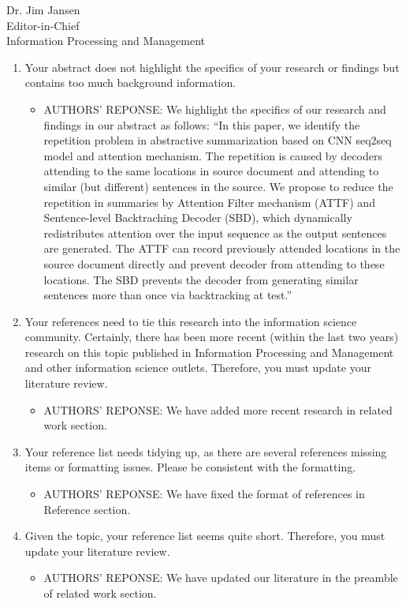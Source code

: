 \documentclass[11pt]{letter} %
\begin{document}
\begin{letter}{Dr. Jim Jansen \\
			Editor-in-Chief  \\
			Information Processing and Management}
		\flushleft
		\begin{enumerate}
			\item Your abstract does not highlight the specifics of your research or findings but contains too much background information.
			\begin{itemize}
				\item[] AUTHORS' REPONSE: We highlight the specifics of our research and findings in our abstract as follows: 
                ``In this paper, we identify the repetition problem in abstractive summarization based on CNN seq2seq model and attention mechanism. The repetition is caused by decoders attending to the same locations in source document and attending to similar (but different) sentences in the source. 
				We propose to reduce the repetition in summaries by Attention Filter mechanism (ATTF) and Sentence-level Backtraching Decoder (SBD), which dynamically redistributes attention over the input sequence as the output sentences are generated. 
				The ATTF can record previously attended locations in the source document directly and prevent decoder from attending to these locations. The SBD prevents the decoder from generating similar sentences more than once via backtracking at test.''
			\end{itemize}
			\item Your references need to tie this research into the information science community. Certainly, there has been more recent (within the last two years) research on this topic published in Information Processing and Management and other information science outlets. Therefore, you must update your literature review. 
			\begin{itemize}
				\item[] AUTHORS' REPONSE: We have added more recent research in related work section.
			\end{itemize}
			\item Your reference list needs tidying up, as there are several references missing items or formatting issues. Please be consistent with the formatting. 
			\begin{itemize}
				\item[] AUTHORS' REPONSE: We have fixed the format of references in Reference section.
			\end{itemize}
			\item Given the topic, your reference list seems quite short. Therefore, you must update your literature review.
			\begin{itemize}
				\item[] AUTHORS' REPONSE: We have updated our literature in the preamble of related work section.

\end{itemize}
\end{enumerate}
\end{letter}
\end{document}
